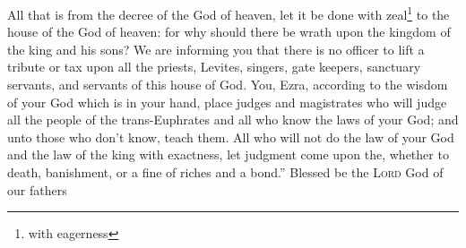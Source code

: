 \begin{enumerate}[align=center]
     All that is from the decree of the God of heaven, let it be done with zeal\footnote{with eagerness} to the house of the God of heaven: for why should there be wrath upon the kingdom of the king and his sons?%
     We are informing you that there is no officer to lift a tribute or tax upon all the priests, Levites, singers, gate keepers, sanctuary servants, and servants of this house of God.%
     You, Ezra, according to the wisdom of your God which is in your hand, place judges and magistrates who will judge all the people of the trans-Euphrates and all who know the laws of your God; and unto those who don't know, teach them.%
     All who will not do the law of your God and the law of the king with exactness, let judgment come upon the, whether to death, banishment, or a fine of riches and a bond.''%
     Blessed be the \textsc{Lord} God of our fathers%
\end{enumerate}
